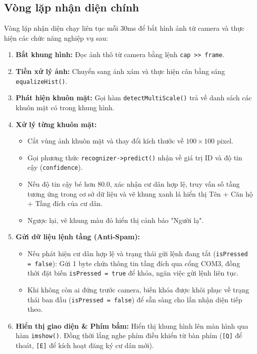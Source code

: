 \documentclass[12pt,a4paper]{article}
\begin{document}
\subsection{Vòng lặp nhận diện chính}
Vòng lặp nhận diện chạy liên tục mỗi 30ms để bắt hình ảnh từ camera và thực hiện các chức năng nghiệp vụ sau:
\begin{enumerate}
    \item \textbf{Bắt khung hình:} Đọc ảnh thô từ camera bằng lệnh \texttt{cap >> frame}.
    \item \textbf{Tiền xử lý ảnh:} Chuyển sang ảnh xám và thực hiện cân bằng sáng \texttt{equalizeHist()}.
    \item \textbf{Phát hiện khuôn mặt:} Gọi hàm \texttt{detectMultiScale()} trả về danh sách các khuôn mặt có trong khung hình.
    \item \textbf{Xử lý từng khuôn mặt:}
    \begin{itemize}
        \item Cắt vùng ảnh khuôn mặt và thay đổi kích thước về $100 \times 100$ pixel.
        \item Gọi phương thức \texttt{recognizer->predict()} nhận về giá trị ID và độ tin cậy (\texttt{confidence}).
        \item Nếu độ tin cậy bé hơn $80.0$, xác nhận cư dân hợp lệ, truy vấn số tầng tương ứng trong cơ sở dữ liệu và vẽ khung xanh lá hiển thị Tên + Căn hộ + Tầng đích của cư dân.
        \item Ngược lại, vẽ khung màu đỏ hiển thị cảnh báo "Người lạ".
    \end{itemize}
    \item \textbf{Gửi dữ liệu lệnh tầng (Anti-Spam):}
    \begin{itemize}
        \item Nếu phát hiện cư dân hợp lệ và trạng thái gửi lệnh đang tắt (\texttt{isPressed = false}): Gửi 1 byte chứa thông tin tầng đích qua cổng COM3, đồng thời đặt biến \texttt{isPressed = true} để khóa, ngăn việc gửi lệnh liên tục.
        \item Khi không còn ai đứng trước camera, biến khóa được khôi phục về trạng thái ban đầu (\texttt{isPressed = false}) để sẵn sàng cho lần nhận diện tiếp theo.
    \end{itemize}
    \item \textbf{Hiển thị giao diện & Phím bấm:} Hiển thị khung hình lên màn hình qua hàm \texttt{imshow()}. Đồng thời lắng nghe phím điều khiển từ bàn phím (\texttt{[Q]} để thoát, \texttt{[E]} để kích hoạt đăng ký cư dân mới).
\end{enumerate}
\end{document}
